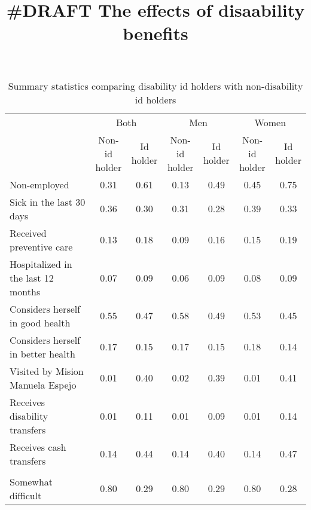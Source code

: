 \documentclass[
]{article}
\title{\#DRAFT The effects of disaability benefits}
\author{}
\date{\vspace{-2.5em}}
\begin{document}
\maketitle

\newpage
\begin{landscape}

\begin{table}

\caption{\label{tab:unnamed-chunk-2}Summary statistics comparing disability id holders with non-disability id holders}
\centering
\fontsize{8.5}{10.5}\selectfont
\begin{tabular}[t]{lcccccc}
\toprule
\multicolumn{1}{c}{ } & \multicolumn{2}{c}{Both} & \multicolumn{2}{c}{Men} & \multicolumn{2}{c}{Women} \\
\cmidrule(l{3pt}r{3pt}){2-3} \cmidrule(l{3pt}r{3pt}){4-5} \cmidrule(l{3pt}r{3pt}){6-7}
  & \makecell[c]{Non-id \\holder} & \makecell[c]{Id \\holder} & \makecell[c]{Non-id \\holder} & \makecell[c]{Id \\holder} & \makecell[c]{Non-id \\holder} & \makecell[c]{Id \\holder}\\
\midrule
Non-employed & 0.31 & 0.61 & 0.13 & 0.49 & 0.45 & 0.75\\
Sick in the last 30 days & 0.36 & 0.30 & 0.31 & 0.28 & 0.39 & 0.33\\
Received preventive care & 0.13 & 0.18 & 0.09 & 0.16 & 0.15 & 0.19\\
Hospitalized in the last 12 months & 0.07 & 0.09 & 0.06 & 0.09 & 0.08 & 0.09\\
Considers herself in good health & 0.55 & 0.47 & 0.58 & 0.49 & 0.53 & 0.45\\
Considers herself in better health & 0.17 & 0.15 & 0.17 & 0.15 & 0.18 & 0.14\\
Visited by Mision Manuela Espejo & 0.01 & 0.40 & 0.02 & 0.39 & 0.01 & 0.41\\
Receives disability transfers & 0.01 & 0.11 & 0.01 & 0.09 & 0.01 & 0.14\\
Receives cash transfers & 0.14 & 0.44 & 0.14 & 0.40 & 0.14 & 0.47\\
\addlinespace[0.4em]
\multicolumn{7}{l}{\textit{Self-assessment of the impairment}}\\
\hspace{1em}Somewhat difficult & 0.80 & 0.29 & 0.80 & 0.29 & 0.80 & 0.28\\

\end{tabular}
\end{table}
\end{landscape}
\end{document}
